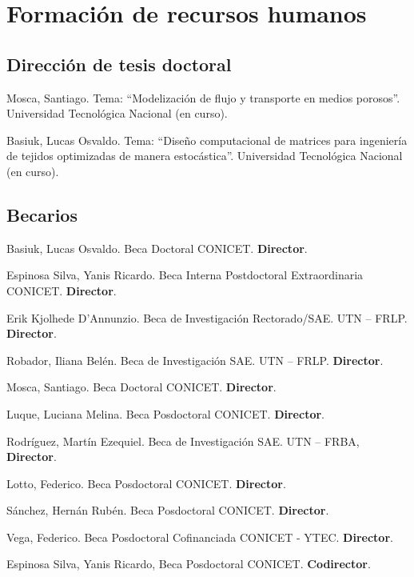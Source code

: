\section{Formación de recursos humanos}

\subsection{Dirección de tesis doctoral}
 Mosca, Santiago. Tema: ``Modelización de flujo y transporte en medios porosos''. Universidad Tecnológica Nacional (en curso).

 Basiuk, Lucas Osvaldo. Tema: ``Diseño computacional de matrices para ingeniería de tejidos optimizadas de manera estocástica''. Universidad Tecnológica Nacional  (en curso).

\subsection{Becarios}

     Basiuk, Lucas Osvaldo. Beca Doctoral CONICET. \textbf{Director}.

     Espinosa Silva, Yanis Ricardo. Beca Interna Postdoctoral Extraordinaria CONICET. \textbf{Director}.

     Erik Kjolhede D'Annunzio. Beca de Investigación Rectorado/SAE. UTN -- FRLP. \textbf{Director}.

     Robador, Iliana Belén. Beca de Investigación SAE. UTN -- FRLP. \textbf{Director}.

     Mosca, Santiago. Beca Doctoral CONICET. \textbf{Director}.

     Luque, Luciana Melina. Beca Posdoctoral CONICET. \textbf{Director}.

     Rodríguez, Martín Ezequiel. Beca de Investigación SAE. UTN -- FRBA, \textbf{Director}.

     Lotto, Federico. Beca Posdoctoral CONICET. \textbf{Director}.

     Sánchez, Hernán Rubén. Beca Posdoctoral CONICET. \textbf{Director}.

     Vega, Federico. Beca Posdoctoral Cofinanciada CONICET - YTEC. \textbf{Director}.

     Espinosa Silva, Yanis Ricardo, Beca Posdoctoral CONICET. \textbf{Codirector}.

